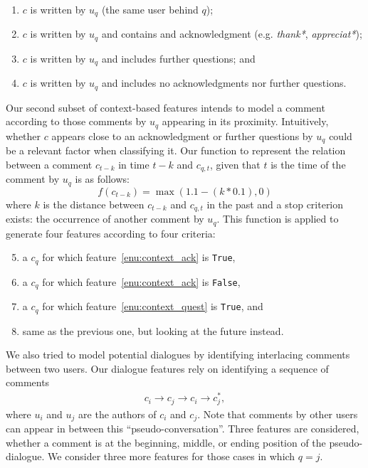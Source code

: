 \begin{enumerate}
\item $c$ is written by $u_q$ (\ie the same user behind $q$); 
\item \label{enu:context_ack} 
  $c$ is written by $u_q$ and contains and acknowledgment (e.g.   
  \textit{thank*}, \textit{appreciat*});
\item \label{enu:context_quest}
  $c$ is written by $u_q$ and includes further questions; and
\item $c$ is written by $u_q$ and includes no acknowledgments nor further 
questions.
\end{enumerate}
% 
Our second subset of context-based features intends to model a comment according 
to those comments by $u_q$ appearing in its proximity. Intuitively, whether $c$ 
appears close to an acknowledgment or further questions by $u_q$ could be a 
relevant factor when classifying it. Our function to represent the relation 
between a comment $c_{t-k}$ in time $t-k$ and $c_{q,t}$, given that $t$ 
is the time of the comment by $u_q$ is as follows:
% 
\begin{equation}
 f(c_{t-k})=\max \left(1.1-(k*0.1) , 0 \right)
\end{equation}
%
where $k$ is the distance between $c_{t-k}$ and $c_{q,t}$ in the past and a 
stop criterion exists: the occurrence of another comment by $u_q$. This function 
is applied to generate four features according to four criteria:

\begin{enumerate}\setcounter{enumi}{4}
\item a $c_q$ for which feature~\ref{enu:context_ack} is \texttt{True},
\item a $c_q$ for which feature~\ref{enu:context_ack} is \texttt{False}, 
\item a $c_q$ for which feature~\ref{enu:context_quest} is \texttt{True}, and 
\item same as the previous one, but looking at the future instead. 
\end{enumerate}


We also tried to model potential dialogues by identifying interlacing comments 
between two users. Our dialogue features rely on identifying 
a sequence of comments 
\begin{align*}
c_i \rightarrow c_j \rightarrow c_i \rightarrow c_j^*,
\end{align*}
% 
where $u_i$ and $u_j$ are the authors of $c_i$ and $c_j$. 
Note that comments by other 
users can appear in between this ``pseudo-conversation''. Three features are 
considered, whether a comment is at the beginning, middle, or ending position of 
the pseudo-dialogue. We consider three more features for those cases in which 
$q=j$. 

